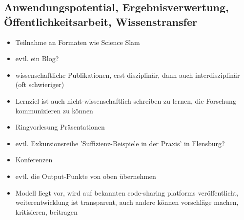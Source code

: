 \subsection*{Anwendungspotential, Ergebnisverwertung, Öffentlichkeitsarbeit, Wissenstransfer}
\begin{itemize}
 \item Teilnahme an Formaten wie Science Slam
 \item evtl. ein Blog?
 \item wissenschaftliche Publikationen, erst disziplinär, dann auch interdisziplinär (oft schwieriger)
 \item Lernziel ist auch nicht-wissenschaftlich schreiben zu lernen, die Forschung kommunizieren zu können
 \item Ringvorlesung Präsentationen
 \item evtl. Exkursionsreihe 'Suffizienz-Beispiele in der Praxis' in Flensburg?
 \item Konferenzen
 \item evtl. die Output-Punkte von oben übernehmen
 \item Modell liegt vor, wird auf bekannten code-sharing platforms veröffentlicht, weiterentwicklung ist transparent, auch andere können vorschläge machen, kritisieren, beitragen
\end{itemize}





